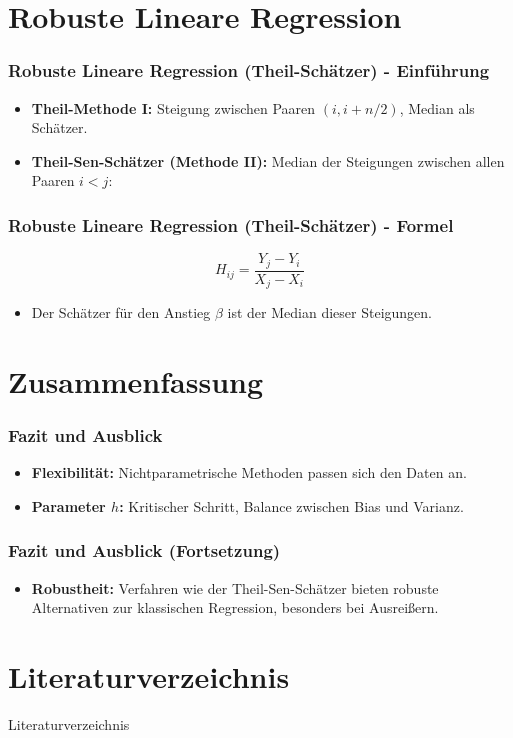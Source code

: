 \documentclass{beamer}
\begin{document}
\section{Robuste Lineare Regression}

\begin{frame}
	\frametitle{Robuste Lineare Regression (Theil-Schätzer) - Einführung}
	
	\begin{itemize}
		\item \textbf{Theil-Methode I:} Steigung zwischen Paaren $(i, i+n/2)$, Median als Schätzer.
		\item \textbf{Theil-Sen-Schätzer (Methode II):} Median der Steigungen zwischen allen Paaren $i < j$:
	\end{itemize}
\end{frame}

\begin{frame}
	\frametitle{Robuste Lineare Regression (Theil-Schätzer) - Formel}
	
	\begin{equation}
		H_{ij} = \frac{Y_j - Y_i}{X_j - X_i}
	\end{equation}
	\begin{itemize}
		\item Der Schätzer für den Anstieg $\beta$ ist der Median dieser Steigungen.
	\end{itemize}
\end{frame}

\section{Zusammenfassung}

\begin{frame}
	\frametitle{Fazit und Ausblick }
	
	\begin{itemize}
		\item \textbf{Flexibilität:} Nichtparametrische Methoden passen sich den Daten an.
		\item \textbf{Parameter $h$:} Kritischer Schritt, Balance zwischen Bias und Varianz.
	\end{itemize}
\end{frame}

\begin{frame}
	\frametitle{Fazit und Ausblick (Fortsetzung)}
	
	\begin{itemize}
		\item \textbf{Robustheit:} Verfahren wie der Theil-Sen-Schätzer bieten robuste Alternativen zur klassischen Regression, besonders bei Ausreißern.
	\end{itemize}
\end{frame}

\section{Literaturverzeichnis}
	
	\begin{frame}[allowframebreaks]{Literaturverzeichnis}
		\printbibliography
	\end{frame}

	
\end{document}
